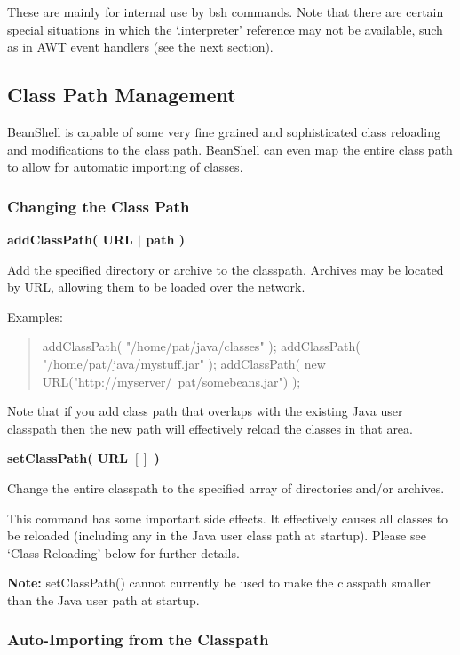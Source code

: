 \documentclass[twoside,11pt,nolof]{starlink}
\begin{document}
These are mainly for internal use by bsh commands.  Note that there
are certain special situations in which the `.interpreter' reference
may not be available, such as in AWT event handlers (see the next
section).

\subsection{Class Path Management}

BeanShell is capable of some very fine grained and sophisticated class
reloading and modifications to the class path.  BeanShell can even map
the entire class path to allow for automatic importing of classes.

\subsubsection{Changing the Class Path}

\textbf{addClassPath( URL $|$ path )}

Add the specified directory or archive to the classpath.  Archives may
be located by URL, allowing them to be loaded over the network.

Examples:
\begin{quote}
\begin{terminalv}
    addClassPath( "/home/pat/java/classes" );
    addClassPath( "/home/pat/java/mystuff.jar" );
    addClassPath( new URL("http://myserver/~pat/somebeans.jar") );
\end{terminalv}
\end{quote}

Note that if you add class path that overlaps with the existing Java
user classpath then the new path will effectively reload the classes
in that area.

\textbf{setClassPath( URL $[]$ )}

Change the entire classpath to the specified array of directories
and/or archives.

This command has some important side effects.  It effectively causes
all classes to be reloaded (including any in the Java user class path
at startup).  Please see `Class Reloading' below for further details.

\textbf{Note:} setClassPath() cannot currently be used to make the classpath
smaller than the Java user path at startup.

\subsubsection{Auto-Importing from the Classpath}
\end{document}

